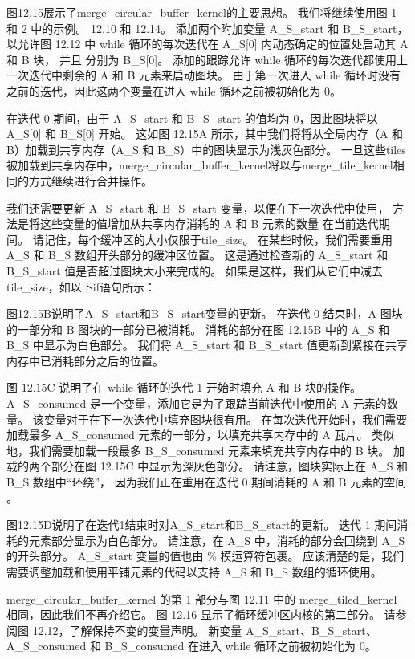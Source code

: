 图12.15展示了merge\_circular\_buffer\_kernel的主要思想。 我们将继续使用图 1 和 2 中的示例。 12.10 和 12.14。 
添加两个附加变量 A\_S\_start 和 B\_S\_start，
以允许图 12.12 中 while 循环的每次迭代在 A\_S[0] 内动态确定的位置处启动其 A 和 B 块，
并且 分别为 B\_S[0]。 添加的跟踪允许 while 循环的每次迭代都使用上一次迭代中剩余的 A 和 B 元素来启动图块。 
由于第一次进入 while 循环时没有之前的迭代，因此这两个变量在进入 while 循环之前被初始化为 0。

在迭代 0 期间，由于 A\_S\_start 和 B\_S\_start 的值均为 0，因此图块将以 A\_S[0] 和 B\_S[0] 开始。 
这如图 12.15A 所示，其中我们将将从全局内存（A 和 B）加载到共享内存（A\_S 和 B\_S）中的图块显示为浅灰色部分。 
一旦这些tiles被加载到共享内存中，merge\_circular\_buffer\_kernel将以与merge\_tile\_kernel相同的方式继续进行合并操作。

我们还需要更新 A\_S\_start 和 B\_S\_start 变量，以便在下一次迭代中使用，
方法是将这些变量的值增加从共享内存消耗的 $\mathrm{A}$ 和 B 元素的数量 在当前迭代期间。 
请记住，每个缓冲区的大小仅限于tile\_size。 在某些时候，我们需要重用 A\_S 和 B\_S 数组开头部分的缓冲区位置。 
这是通过检查新的 A\_S\_start 和 B\_S\_start 值是否超过图块大小来完成的。 
如果是这样，我们从它们中减去tile\_size，如以下if语句所示：

图12.15B说明了A\_S\_start和B\_S\_start变量的更新。 
在迭代 0 结束时，$\mathrm{A}$ 图块的一部分和 $\mathrm{B}$ 图块的一部分已被消耗。 
消耗的部分在图 12.15B 中的 A\_S 和 B\_S 中显示为白色部分。 
我们将 A\_S\_start 和 B\_S\_start 值更新到紧接在共享内存中已消耗部分之后的位置。

图 $12.15 \mathrm{C}$ 说明了在 while 循环的迭代 1 开始时填充 $\mathrm{A}$ 和 $\mathrm{B}$ 块的操作。 
A\_S\_consumed 是一个变量，添加它是为了跟踪当前迭代中使用的 $\mathrm{A}$ 元素的数量。 
该变量对于在下一次迭代中填充图块很有用。 
在每次迭代开始时，我们需要加载最多 A\_S\_consumed 元素的一部分，以填充共享内存中的 A 瓦片。 
类似地，我们需要加载一段最多 B\_S\_consumed 元素来填充共享内存中的 B 块。 
加载的两个部分在图 12.15C 中显示为深灰色部分。 
请注意，图块实际上在 A\_S 和 B\_S 数组中“环绕”，
因为我们正在重用在迭代 0 期间消耗的 $\mathrm{A}$ 和 $\mathrm{B}$ 元素的空间 。

图12.15D说明了在迭代1结束时对A\_S\_start和B\_S\_start的更新。 迭代 1 期间消耗的元素部分显示为白色部分。 
请注意，在 A\_S 中，消耗的部分会回绕到 A\_S 的开头部分。 A\_S\_start 变量的值也由 \% 模运算符包裹。 
应该清楚的是，我们需要调整加载和使用平铺元素的代码以支持 A\_S 和 B\_S 数组的循环使用。

merge\_circular\_buffer\_kernel 的第 1 部分与图 12.11 中的 merge\_tiled\_kernel 相同，因此我们不再介绍它。 
图 12.16 显示了循环缓冲区内核的第二部分。 请参阅图 12.12，了解保持不变的变量声明。 
新变量 A\_S\_start、B\_S\_start、A\_S\_consumed 和 B\_S\_consumed 在进入 while 循环之前被初始化为 0。

